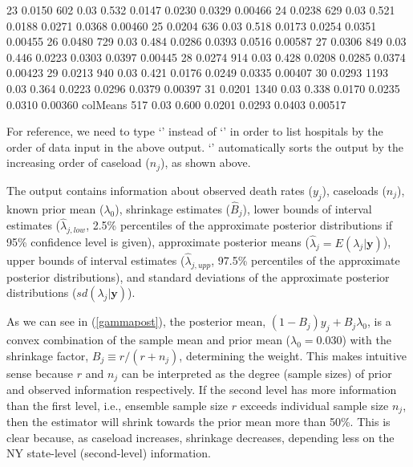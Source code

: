 \documentclass[article]{jss}
\begin{document}
\begin{CodeChunk}
\begin{CodeOutput}
23         0.0150  602       0.03     0.532   0.0147    0.0230   0.0329 0.00466
24         0.0238  629       0.03     0.521   0.0188    0.0271   0.0368 0.00460
25         0.0204  636       0.03     0.518   0.0173    0.0254   0.0351 0.00455
26         0.0480  729       0.03     0.484   0.0286    0.0393   0.0516 0.00587
27         0.0306  849       0.03     0.446   0.0223    0.0303   0.0397 0.00445
28         0.0274  914       0.03     0.428   0.0208    0.0285   0.0374 0.00423
29         0.0213  940       0.03     0.421   0.0176    0.0249   0.0335 0.00407
30         0.0293 1193       0.03     0.364   0.0223    0.0296   0.0379 0.00397
31         0.0201 1340       0.03     0.338   0.0170    0.0235   0.0310 0.00360
colMeans           517       0.03     0.600   0.0201    0.0293   0.0403 0.00517
\end{CodeOutput}
\end{CodeChunk}

For reference, we need to type `' instead of `' in order to list hospitals by the order of data input in the above output. `' automatically sorts the output by the increasing order of caseload ($n_{j}$), as shown above.


The output contains information about observed death rates ($y_{j}$), caseloads ($n_{j}$), known prior mean ($\lambda_{0}$), shrinkage estimates ($\hat{B}_{j}$), lower bounds of interval estimates ($\hat{\lambda}_{j, low}$, 2.5\% percentiles of the approximate posterior distributions if 95\% confidence level is given), approximate posterior means ($\hat{\lambda}_{j}=E(\lambda_{j}\vert \boldsymbol{y})$), upper bounds  of interval estimates ($\hat{\lambda}_{j, upp}$, 97.5\% percentiles of the approximate posterior distributions), and standard deviations of the approximate posterior distributions ($sd(\lambda_{j}\vert \boldsymbol{y})$).


As we can see in (\ref{gammapost}), the posterior mean, $(1-B_{j})y_{j} + B_{j}\lambda_{0}$, is a convex combination of the sample mean and prior mean ($\lambda_{0}=0.030$) with the shrinkage factor, $B_{j}\equiv r / (r + n_{j})$, determining the weight. This makes intuitive sense because $r$ and $n_{j}$ can be interpreted as the degree (sample sizes) of prior and observed information respectively. If the second level has more information than the first level, i.e., ensemble sample size $r$ exceeds individual sample size $n_{j}$, then the estimator will shrink towards the prior mean more than 50\%. This is clear because, as caseload increases, shrinkage decreases, depending less on the NY state-level (second-level) information.
\end{document}
